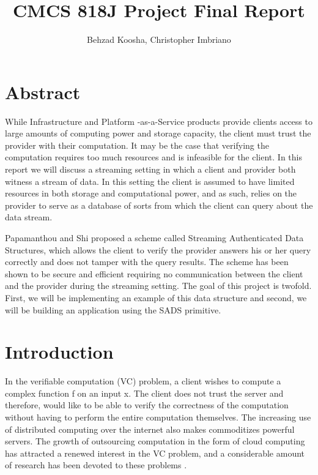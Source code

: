 \documentclass[11pt, letterpaper, oneside]{article}
\begin{document}
\title{\textbf{CMCS 818J Project Final Report}}
\author{Behzad Koosha, Christopher Imbriano}

\maketitle

\section{Abstract}

	While Infrastructure and Platform -as-a-Service products provide clients access to large amounts of computing power and storage capacity, the client must trust the provider with their computation.
	It may be the case that verifying the computation requires too much resources and is infeasible for the client.
	In this report we will discuss a streaming setting in which a client and provider both witness a stream of data.
	In this setting the client is assumed to have limited resources in both storage and computational power, and as such, relies on the provider to serve as a database of sorts from which the client can query about the data stream.
	
	Papamanthou and Shi \cite{sads} proposed a scheme called Streaming Authenticated Data Structures, which allows the client to verify the provider answers his or her query correctly and does not tamper with the query results.
	The scheme has been shown to be secure and efficient requiring no communication between the client and the provider during the streaming setting.
	The goal of this project is twofold. First, we will be implementing an example of this data
	structure and second, we will be building an application using the SADS primitive. 


\section{Introduction}

	In the verifiable computation (VC) problem, a client wishes to compute a complex function f on an input x.
	The client does not trust the server and therefore, would like to be able to verify the correctness of the computation without having to perform the entire computation themselves.
	The increasing use of distributed computing over the internet also makes commoditizes powerful servers.
	The growth of outsourcing computation in the form of cloud computing has attracted a renewed interest in the VC problem, and a considerable amount of research has been devoted to these problems \cite{evsc}.
	
\end{document}
